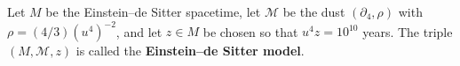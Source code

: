 Let $M$ be the Einstein--de Sitter spacetime, let $\mathcal{M}$ be the dust $(\partial_4, \rho)$ with $\rho = (4/3)(u^4)^{-2}$, and let $z \in M$ be chosen so that $u^4 z = 10^{10}$ years. The triple $(M, \mathcal{M}, z)$ is called the \textbf{Einstein--de Sitter model}.
